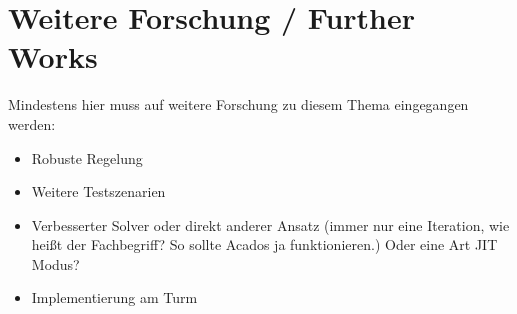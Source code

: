 \chapter{Weitere Forschung / Further Works} \label{ch_FurtherWorks}
Mindestens hier muss auf weitere Forschung zu diesem Thema eingegangen werden:

\begin{itemize}
    \item Robuste Regelung
    \item Weitere Testszenarien
\item Verbesserter Solver oder direkt anderer Ansatz (immer nur eine Iteration, wie heißt der Fachbegriff? So sollte Acados ja funktionieren.) Oder eine Art JIT Modus?
\item Implementierung am Turm
\end{itemize}